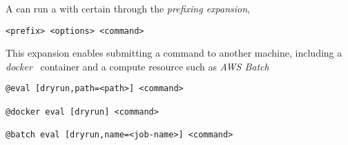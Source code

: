 A  can run a  with certain  through the \emph{prefixing expansion},
%
\begin{verbatim}
<prefix> <options> <command>
\end{verbatim}
%
This expansion enables submitting a command to another machine, including a \emph{docker}~\cite{docker} container and a compute resource such as \emph{AWS Batch}~\cite{aws_batch}
%
\begin{verbatim}
@eval [dryrun,path=<path>] <command>

@docker eval [dryrun] <command>

@batch eval [dryrun,name=<job-name>] <command>
\end{verbatim}